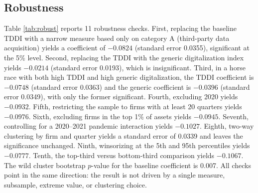 

\subsection{Robustness}

Table \ref{tab:robust} reports 11 robustness checks. First, replacing the baseline TDDI with a narrow measure based only on category A (third-party data acquisition) yields a coefficient of $-0.0824$ (standard error 0.0355), significant at the 5\% level. Second, replacing the TDDI with the generic digitalization index yields $-0.0214$ (standard error 0.0193), which is insignificant. Third, in a horse race with both high TDDI and high generic digitalization, the TDDI coefficient is $-0.0748$ (standard error 0.0363) and the generic coefficient is $-0.0396$ (standard error 0.0349), with only the former significant. Fourth, excluding 2020 yields $-0.0932$. Fifth, restricting the sample to firms with at least 20 quarters yields $-0.0976$. Sixth, excluding firms in the top 1\% of assets yields $-0.0945$. Seventh, controlling for a 2020--2021 pandemic interaction yields $-0.1027$. Eighth, two-way clustering by firm and quarter yields a standard error of 0.0339 and leaves the significance unchanged. Ninth, winsorizing at the 5th and 95th percentiles yields $-0.0777$. Tenth, the top-third versus bottom-third comparison yields $-0.1067$. The wild cluster bootstrap $p$-value for the baseline coefficient is 0.007. All checks point in the same direction: the result is not driven by a single measure, subsample, extreme value, or clustering choice.



